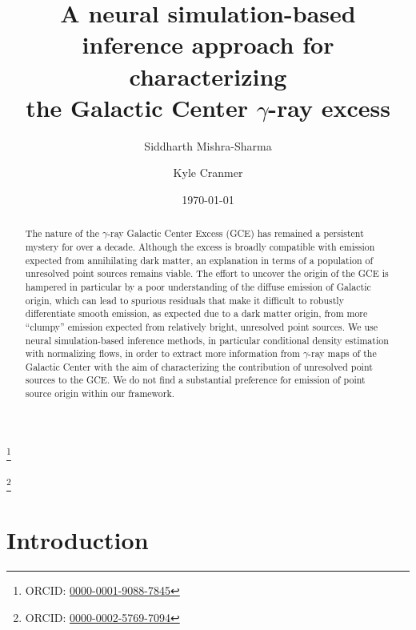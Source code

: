 \documentclass[prd,aps,10pt,nofootinbib,twocolumn,superscriptaddress,preprintnumbers,balancelastpage,longbibliography]{revtex4-1}
\begin{document}
\title{A neural simulation-based inference approach for characterizing \\ the Galactic Center $\gamma$-ray excess}
 
\author{Siddharth Mishra-Sharma}
\thanks{ORCID: \href{https://orcid.org/0000-0001-9088-7845}{0000-0001-9088-7845}}

\author{Kyle Cranmer}
\thanks{ORCID: \href{https://orcid.org/0000-0002-5769-7094}{0000-0002-5769-7094}}

\date{\today}

\begin{abstract}
The nature of the \Fermi $\gamma$-ray Galactic Center Excess (GCE) has remained a persistent mystery for over a decade. Although the excess is broadly compatible with emission expected from annihilating dark matter, an explanation in terms of a population of unresolved point sources remains viable. The effort to uncover the origin of the GCE is hampered in particular by a poor understanding of the diffuse emission of Galactic origin, which can lead to spurious residuals that make it difficult to robustly differentiate smooth emission, as expected due to a dark matter origin, from more ``clumpy'' emission expected from relatively bright, unresolved point sources. We use neural simulation-based inference methods, in particular conditional density estimation with normalizing flows, in order to extract more information from $\gamma$-ray maps of the Galactic Center with the aim of characterizing the contribution of unresolved point sources to the GCE. We do not find a substantial preference for emission of point source origin within our framework.
\end{abstract}

\maketitle

\section{Introduction}
\label{sec:intro}
\end{document}
